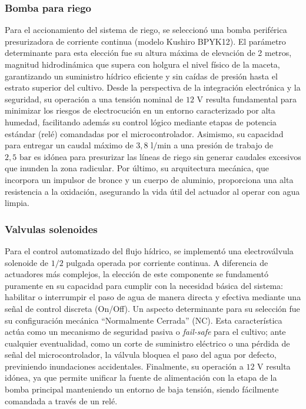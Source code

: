 \subsubsection{Bomba para riego}
Para el accionamiento del sistema de riego, se seleccionó una bomba periférica presurizadora de corriente continua (modelo Kushiro BPYK12). El parámetro determinante para esta elección fue su altura máxima de elevación de 2 metros, magnitud hidrodinámica que supera con holgura el nivel físico de la maceta, garantizando un suministro hídrico eficiente y sin caídas de presión hasta el estrato superior del cultivo. Desde la perspectiva de la integración electrónica y la seguridad, su operación a una tensión nominal de $12\text{ V}$ resulta fundamental para minimizar los riesgos de electrocución en un entorno caracterizado por alta humedad, facilitando además su control lógico mediante etapas de potencia estándar (relé) comandadas por el microcontrolador. Asimismo, su capacidad para entregar un caudal máximo de $3{,}8\text{ l/min}$ a una presión de trabajo de $2{,}5\text{ bar}$ es idónea para presurizar las líneas de riego sin generar caudales excesivos que inunden la zona radicular. Por último, su arquitectura mecánica, que incorpora un impulsor de bronce y un cuerpo de aluminio, proporciona una alta resistencia a la oxidación, asegurando la vida útil del actuador al operar con agua limpia.

\subsubsection{Valvulas solenoides}
Para el control automatizado del flujo hídrico, se implementó una electroválvula solenoide de $1/2$ pulgada operada por corriente continua. A diferencia de actuadores más complejos, la elección de este componente se fundamentó puramente en su capacidad para cumplir con la necesidad básica del sistema: habilitar o interrumpir el paso de agua de manera directa y efectiva mediante una señal de control discreta (On/Off). Un aspecto determinante para su selección fue su configuración mecánica ``Normalmente Cerrada'' (NC). Esta característica actúa como un mecanismo de seguridad pasiva o \textit{fail-safe} para el cultivo; ante cualquier eventualidad, como un corte de suministro eléctrico o una pérdida de señal del microcontrolador, la válvula bloquea el paso del agua por defecto, previniendo inundaciones accidentales. Finalmente, su operación a $12\text{ V}$ resulta idónea, ya que permite unificar la fuente de alimentación con la etapa de la bomba principal manteniendo un entorno de baja tensión, siendo fácilmente comandada a través de un relé.

